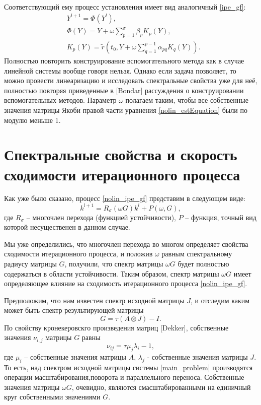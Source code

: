 \documentclass[a4paper,14pt]{extreport}
\begin{document}
Соответствующий ему процесс установления имеет вид аналогичный \eqref{ipe_gf}:
	\begin{equation}
	\label{nolin_ipe_gf}
	\begin{aligned}
	&Y^{l+1}=\Phi(Y^{l}),\\
	&\Phi(Y)=Y+\omega \sum_{p=1}^{\sigma}\beta_{p}K_p(Y),\\
	&K_p(Y)=\tilde r(t_0,Y+\omega \sum_{q=1}^{p-1}\alpha_{pq}K_q(Y)).
	\end{aligned}
	\end{equation}
Полностью повторить конструирование вспомогательного метода как в случае
линейной системы вообще говоря нельзя. Однако если задача позволяет, то можно
провести линеаризацию и исследовать спектральные свойства уже для неё, полностью
повторяя приведенные в [Bondar] рассуждения о конструировании вспомогательных методов.
Параметр $\omega$ полагаем таким, чтобы все собственные значения матрицы Якоби
правой части уравнения \eqref{nolin_estEquation} были по модулю меньше 1.
  
  \section{Спектральные свойства и скорость сходимости итерационного процесса}
  \label{s:spectral_speed} 
Как уже было сказано, процесс \eqref{nolin_ipe_gf} представим в следующем виде:
	\begin{equation}
	\label{ipe_spektr_form}
	k^{l+1} = R_\sigma(\omega G)k^l+P(\omega, G),
	\end{equation}
где $R_\sigma$ -- многочлен перехода (функцией устойчивости),  $P$ -- функция, точный вид которой несущественен в данном случае.
	
	Мы уже определились, что многочлен перехода во многом определяет свойства сходимости итерационного процесса, и положив $\omega$ равным спектральному радиусу матрицы $G$, получили, что спектр матрицы $\omega G$ будет полностью содержаться в области устойчивости. Таким образом, спектр матрицы $\omega G$ имеет определяющее влияние на сходимость итерационного процесса \eqref{nolin_ipe_gf}.

Предположим, что нам известен спектр исходной матрицы $J$, и отследим каким может быть спектр результирующей матрицы
	$$G = \tau(A\otimes J) - I.$$
По свойству кронекеровскго произведения матриц [Dekker], собственные значения $\nu_{i,j}$ матрицы $G$ равны
	\begin{equation}\label{spektrG}
	\nu_{ij} = \tau \mu_j \lambda_i - 1,
	\end{equation}
где $\mu_i$ -- собственные значения матрицы $A$, $\lambda_j$ - собственные значения матрицы $J$. То есть, над  спектром исходной матрицы системы \eqref{main_problem} производятся операции масштабирования,поворота и параллельного переноса. Собственные значения матрицы $\omega G$, очевидно, являются смасштабированными на единичный круг собственными значениями  $G$. 
\end{document}
